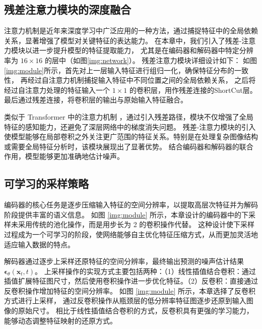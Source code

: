 \subsection{残差注意力模块的深度融合}
注意力机制是近年来深度学习中广泛应用的一种方法，通过捕捉特征中的全局依赖关系，显著增强了模型对关键特征的表达能力。
在本章中，我们引入了残差-注意力模块以进一步提升模型的特征提取能力，
尤其是在编码器和解码器中特定分辨率为 $16 \times 16$ 的层中（如图\ref{img:network}）。
残差注意力模块详细设计如下：
如图\ref{img:module}所示，首先对上一层输入特征进行组归一化，确保特征分布的一致性，
再经过自注意力机制捕捉输入特征中不同位置之间的全局依赖关系，
之后将经过自注意力处理的特征输入一个 $1 \times 1$ 的卷积层，用作残差连接的ShortCut层。
最后通过残差连接，将卷积层的输出与原始输入特征融合。

类似于 Transformer 中的注意力机制 \cite{2017attention}，通过引入残差路径，模块不仅增强了全局特征的感知能力，还避免了深层网络中的梯度消失问题。
残差-注意力模块的引入使模型能够在局部卷积之外关注更广范围的特征关系。特别是在处理复杂图像结构或需要全局特征分析时，该模块展现出了显著优势。
结合编码器和解码器的联合作用，模型能够更加准确地估计噪声。

\subsection{可学习的采样策略}
编码器的核心任务是逐步压缩输入特征的空间分辨率，以提取高层次特征并为解码阶段提供丰富的语义信息。
如图 \ref{img:module} 所示，本章设计的编码器中的下采样未采用传统的池化操作，而是用步长为 2 的卷积操作代替。
这种设计使下采样过程成为一个可学习的阶段，使网络能够自主优化特征压缩方式，从而更加灵活地适应输入数据的特点。

解码器通过逐步上采样还原特征的空间分辨率，最终输出预测的噪声估计结果 $\boldsymbol{\epsilon}_\theta(\mathbf{x}_t, t)$。
上采样操作的实现方式主要包括两种：（1）线性插值结合卷积：通过插值扩展特征图尺寸，然后使用卷积操作进一步优化特征。（2）反卷积：直接通过反卷积操作增加特征的空间分辨率。
如图 \ref{img:module} 所示，本章选择了反卷积方式进行上采样，
通过反卷积操作从瓶颈层的低分辨率特征图逐步还原到输入图像的原始尺寸。
相比于线性插值结合卷积的方式，反卷积具有更强的学习能力，能够动态调整特征映射的还原方式。


